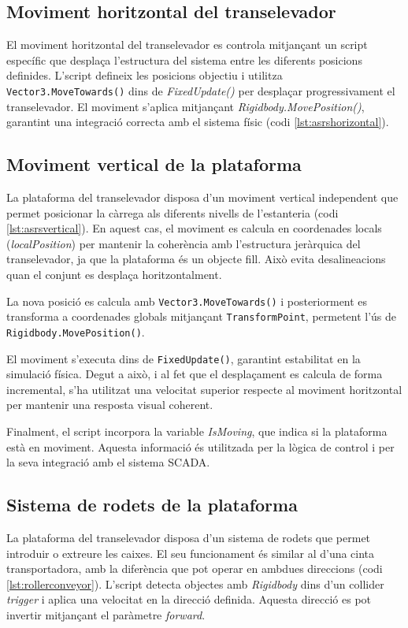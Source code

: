\documentclass[a4paper,11pt,DIV=13,headings=normal,abstract=true,twoside=semi]{article}
\begin{document}
\subsection*{Moviment horitzontal del transelevador}

El moviment horitzontal del transelevador es controla mitjançant un script específic que desplaça l'estructura del sistema entre les diferents posicions definides. L'script defineix les posicions objectiu i utilitza \texttt{Vector3.MoveTowards()} dins de \textit{FixedUpdate()} \cite{UnityUpdate} per desplaçar progressivament el transelevador. El moviment s'aplica mitjançant \textit{Rigidbody.MovePosition()}, garantint una integració correcta amb el sistema físic (codi \ref{lst:asrshorizontal}).

\subsection*{Moviment vertical de la plataforma}

La plataforma del transelevador disposa d'un moviment vertical \cite{UnityElevatorVideo} independent que permet posicionar la càrrega als diferents nivells de l'estanteria (codi \ref{lst:asrsvertical}). En aquest cas, el moviment es calcula en coordenades locals (\textit{localPosition}) \cite{UnityTransformLocalPosition} per mantenir la coherència amb l'estructura jeràrquica del transelevador, ja que la plataforma és un objecte fill. Això evita desalineacions quan el conjunt es desplaça horitzontalment.

La nova posició es calcula amb \texttt{Vector3.MoveTowards()} i posteriorment es transforma a coordenades globals mitjançant \texttt{TransformPoint}, permetent l'ús de \texttt{Rigidbody.MovePosition()}.

El moviment s'executa dins de \texttt{FixedUpdate()}, garantint estabilitat en la simulació física. Degut a això, i al fet que el desplaçament es calcula de forma incremental, s'ha utilitzat una velocitat superior respecte al moviment horitzontal per mantenir una resposta visual coherent.

Finalment, el script incorpora la variable \textit{IsMoving}, que indica si la plataforma està en moviment. Aquesta informació és utilitzada per la lògica de control i per la seva integració amb el sistema SCADA.

\subsection*{Sistema de rodets de la plataforma}
\label{sec:rollers}
La plataforma del transelevador disposa d'un sistema de rodets que permet introduir o extreure les caixes. El seu funcionament és similar al d'una cinta transportadora, amb la diferència que pot operar en ambdues direccions (codi \ref{lst:rollerconveyor}).  L'script detecta objectes amb \textit{Rigidbody} \cite{UnityRigidbody} dins d'un collider \textit{trigger} i aplica una velocitat en la direcció definida. Aquesta direcció es pot invertir mitjançant el paràmetre \textit{forward}.
\end{document}
